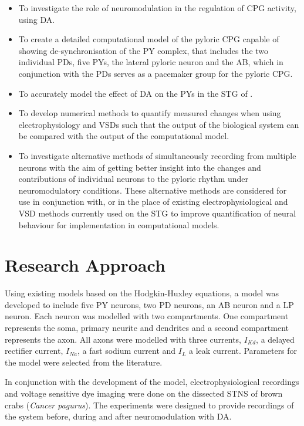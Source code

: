 \begin{itemize}
	\item To investigate the role of neuromodulation in the regulation of \ac{CPG} activity, using \ac{DA}.
	\item To create a detailed computational model of the pyloric \ac{CPG} capable of showing de-synchronisation of the \ac{PY} complex, that includes the two individual \ac{PD}s, five \ac{PY}s, the lateral pyloric neuron and the \ac{AB}, which in conjunction with the \ac{PD}s serves as a pacemaker group for the pyloric \ac{CPG}.
	\item To accurately model the effect of \ac{DA} on the \acp{PY} in the \ac{STG} of .
	\item To develop numerical methods to quantify measured changes when using electrophysiology and \acp{VSD} such that the output of the biological system can be compared with the output of the computational model.
	\item To investigate alternative methods of simultaneously recording from multiple neurons with the aim of getting better insight into the changes and contributions of individual neurons to the pyloric rhythm under neuromodulatory conditions. These alternative methods are considered for use in conjunction with, or in the place of existing electrophysiological and \ac{VSD} methods currently used on the \ac{STG} to improve quantification of neural behaviour for implementation in computational models.
\end{itemize}

\section{Research Approach}
Using existing models based on the Hodgkin-Huxley equations, a model was developed to include five \ac{PY} neurons, two \ac{PD} neurons, an \ac{AB} neuron and a \ac{LP} neuron. Each neuron was modelled with two compartments. One compartment represents the soma, primary neurite and dendrites and a second compartment represents the axon. All axons were modelled with three currents, $I_{Kd}$, a delayed rectifier current, $I_{Na}$, a fast sodium current and $I_{L}$ a leak current. Parameters for the model were selected from the literature.

In conjunction with the development of the model, electrophysiological recordings and voltage sensitive dye imaging were done on the dissected \ac{STNS} of brown crabs (\textit{Cancer pagurus}). The experiments were designed to provide recordings of the system before, during and after neuromodulation with \ac{DA}.

